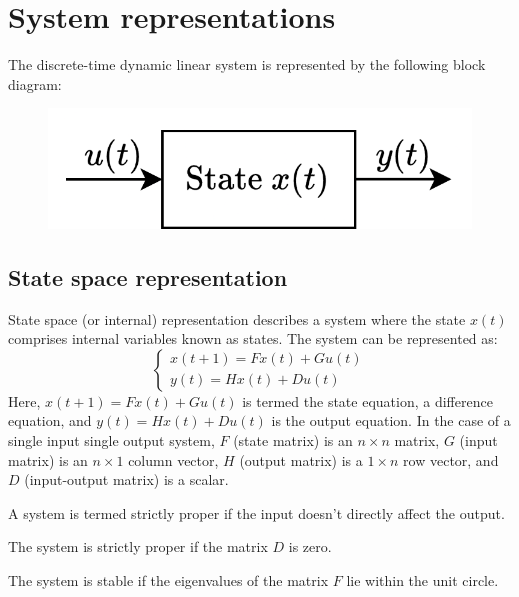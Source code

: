 \section{System representations}

The discrete-time dynamic linear system is represented by the following block diagram:
\begin{figure}[H]
    \centering
    \includegraphics[width=0.4\linewidth]{images/rep.png}
\end{figure}

\subsection{State space representation}
State space (or internal) representation describes a system where the state $x(t)$ comprises internal variables known as states. 
The system can be represented as:
\[\begin{cases}
    x(t+1)=Fx(t)+Gu(t) \\
    y(t)=Hx(t)+Du(t)
\end{cases}\]
Here, $x(t+1)=Fx(t)+Gu(t)$ is termed the state equation, a difference equation, and $y(t)=Hx(t)+Du(t)$ is the output equation.
In the case of a single input single output system, $F$ (state matrix) is an $n \times n$ matrix, $G$ (input matrix) is an $n \times 1$ column vector, $H$ (output matrix) is a $1 \times n$ row vector, and $D$ (input-output matrix) is a scalar. 
\begin{definition}
    A system is termed strictly proper if the input doesn't directly affect the output.
\end{definition}
\begin{property}
    The system is strictly proper if the matrix $D$ is zero. 
\end{property}    
\begin{property}
    The system is stable if the eigenvalues of the matrix $F$ lie within the unit circle.
\end{property}
